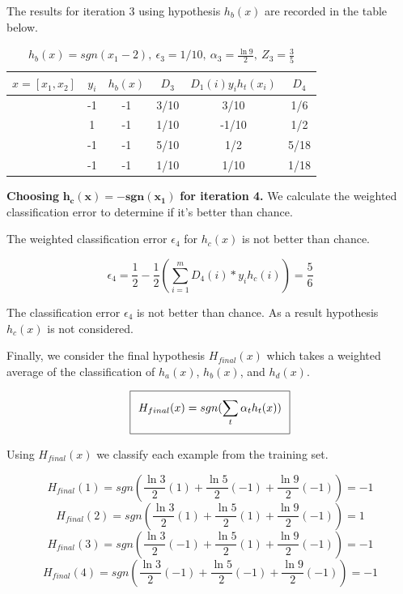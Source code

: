\documentclass[11pt]{article}
\begin{document}
The results for iteration 3 using hypothesis $h_b(x)$ are recorded in the table below.

\begin{table}[H]
\centering
{\renewcommand{\arraystretch}{1.2}%
\begin{tabular}{| c | c | c | c | c | c |}
\hline
$x = [x_1, x_2]$& $y_i$ & $h_b(x)$ & $D_3$ & $D_1(i)y_ih_t(x_i)$ & $D_4$\\
\hline
[1,1] & -1 & -1&  3/10&  3/10& 1/6\\ \hline
[1,-1] & 1 &  -1&  1/10&  -1/10& 1/2\\ \hline
[-1,-1] & -1 & -1 & 5/10&  1/2& 5/18\\ \hline
[-1,1] & -1 &  -1&  1/10&  1/10& 1/18\\ \hline
\end{tabular}}
\caption{$h_b(x) = sgn(x_1 - 2), \ \epsilon_3 = 1/10, \ \alpha_3 = \frac{\ln9}{2}, \ Z_3 = \frac{3}{5}$}
\end{table}

\textbf{Choosing} $\mathbf{h_c(x) = -sgn(x_1)}$ \textbf{for iteration 4.} We calculate the weighted classification error to determine if it's better than chance.

The weighted classification error $\epsilon_4$ for $h_c(x)$ is not better than chance.

$$\epsilon_4 = \frac{1}{2} - \frac{1}{2}(\sum_{i=1}^m D_4(i)*y_ih_c(i)) = \frac{5}{6}$$

The classification error $\epsilon_4$ is not better than chance. As a result hypothesis $h_c(x)$ is not considered.

Finally, we consider the final hypothesis $H_{final}(x)$ which takes a weighted average of the classification of $h_a(x)$, $h_b(x)$, and $h_d(x)$.

\begin{equation}
\setlength\fboxsep{0.25cm}
\setlength\fboxrule{0.4pt}
\boxed{H_{final}(x) = sgn(\sum_{t}\alpha_th_t(x))}
\end{equation}

Using $H_{final}(x)$ we classify each example from the training set.

$$H_{final}(1) = sgn(\frac{\ln3}{2}(1) + \frac{\ln5}{2}(-1) + \frac{\ln9}{2}(-1)) = -1$$
$$H_{final}(2) = sgn(\frac{\ln3}{2}(1) + \frac{\ln5}{2}(1) + \frac{\ln9}{2}(-1)) = 1$$
$$H_{final}(3) = sgn(\frac{\ln3}{2}(-1) + \frac{\ln5}{2}(1) + \frac{\ln9}{2}(-1)) = -1$$
$$H_{final}(4) = sgn(\frac{\ln3}{2}(-1) + \frac{\ln5}{2}(-1) + \frac{\ln9}{2}(-1)) = -1$$
\end{document}

